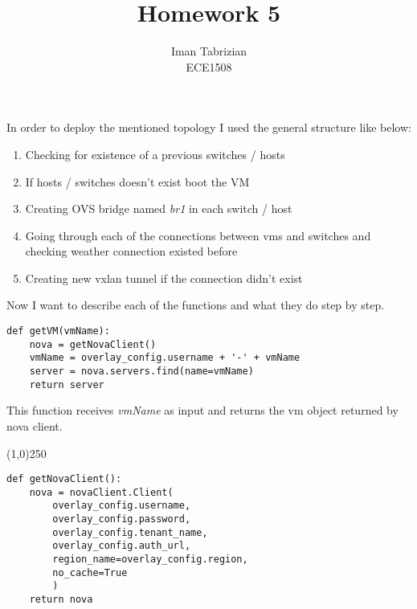 \documentclass[12pt]{article}
\begin{document}
 
 
\title{Homework 5}
\author{Iman Tabrizian\\ %
ECE1508}

\maketitle

In order to deploy the mentioned topology I used the general structure like below: 

\begin{enumerate}
	\item Checking for existence of a previous switches / hosts
	\item If hosts / switches doesn't exist boot the VM 
	\item Creating OVS bridge named \textit{br1} in each switch / host
	\item Going through each of the connections between vms and switches and checking weather connection existed before
	\item Creating new vxlan tunnel if the connection didn't exist
\end{enumerate}


Now I want to describe each of the functions and what they do step by step. \\

\begin{verbatim}
def getVM(vmName):
    nova = getNovaClient()
    vmName = overlay_config.username + '-' + vmName
    server = nova.servers.find(name=vmName)
    return server
\end{verbatim}

This function receives \textit{vmName} as input and returns the vm object returned by nova client. \\
\begin{center}
	\line(1,0){250}
\end{center}

\begin{verbatim}
def getNovaClient():
    nova = novaClient.Client(
        overlay_config.username,
        overlay_config.password,
        overlay_config.tenant_name,
        overlay_config.auth_url,
        region_name=overlay_config.region,
        no_cache=True
        )
    return nova
\end{verbatim}
\end{document}
